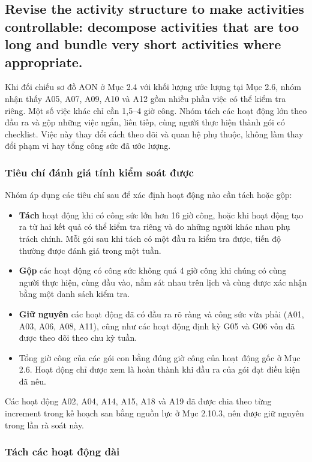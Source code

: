 
\subsection{Revise the activity structure to make activities controllable: decompose activities that are too long and bundle very short activities where appropriate.}

Khi đối chiếu sơ đồ AON ở Mục 2.4 với khối lượng ước lượng tại Mục 2.6, nhóm nhận thấy A05, A07, A09, A10 và A12 gồm nhiều phần việc có thể kiểm tra riêng. Một số việc khác chỉ cần 1,5–4 giờ công. Nhóm tách các hoạt động lớn theo đầu ra và gộp những việc ngắn, liên tiếp, cùng người thực hiện thành gói có checklist. Việc này thay đổi cách theo dõi và quan hệ phụ thuộc, không làm thay đổi phạm vi hay tổng công sức đã ước lượng.

\subsubsection{Tiêu chí đánh giá tính kiểm soát được}

Nhóm áp dụng các tiêu chí sau để xác định hoạt động nào cần tách hoặc gộp:

\begin{itemize}
    \item \textbf{Tách} hoạt động khi có công sức lớn hơn 16 giờ công, hoặc khi hoạt động tạo ra từ hai kết quả có thể kiểm tra riêng và do những người khác nhau phụ trách chính. Mỗi gói sau khi tách có một đầu ra kiểm tra được, tiến độ thường được đánh giá trong một tuần.
    \item \textbf{Gộp} các hoạt động có công sức không quá 4 giờ công khi chúng có cùng người thực hiện, cùng đầu vào, nằm sát nhau trên lịch và cùng được xác nhận bằng một danh sách kiểm tra.
    \item \textbf{Giữ nguyên} các hoạt động đã có đầu ra rõ ràng và công sức vừa phải (A01, A03, A06, A08, A11), cũng như các hoạt động định kỳ G05 và G06 vốn đã được theo dõi theo chu kỳ tuần.
    \item Tổng giờ công của các gói con bằng đúng giờ công của hoạt động gốc ở Mục 2.6. Hoạt động chỉ được xem là hoàn thành khi đầu ra của gói đạt điều kiện đã nêu.
\end{itemize}

Các hoạt động A02, A04, A14, A15, A18 và A19 đã được chia theo từng increment trong kế hoạch san bằng nguồn lực ở Mục 2.10.3, nên được giữ nguyên trong lần rà soát này.

\subsubsection{Tách các hoạt động dài}

